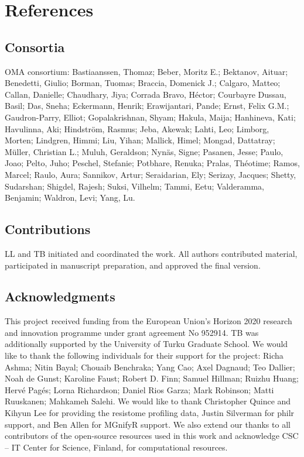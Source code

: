 \documentclass[
  sn-nature,
]{sn-jnl}
\begin{document}
\section{References}\label{references}

\renewcommand{\bibsection}{}


\subsection{Consortia}\label{sec-consortium}

OMA consortium: Bastiaanssen, Thomaz; Beber, Moritz E.; Bektanov,
Aituar; Benedetti, Giulio; Borman, Tuomas; Braccia, Domenick J.;
Calgaro, Matteo; Callan, Danielle; Chaudhary, Jiya; Corrada Bravo,
Héctor; Courbayre Dussau, Basil; Das, Sneha; Eckermann, Henrik;
Erawijantari, Pande; Ernst, Felix G.M.; Gaudron-Parry, Elliot;
Gopalakrishnan, Shyam; Hakula, Maija; Hanhineva, Kati; Havulinna, Aki;
Hindström, Rasmus; Jeba, Akewak; Lahti, Leo; Limborg, Morten; Lindgren,
Himmi; Liu, Yihan; Mallick, Himel; Mongad, Dattatray; Müller, Christian
L.; Muluh, Geraldson; Nynäs, Signe; Pasanen, Jesse; Paulo, Joao; Pelto,
Juho; Peschel, Stefanie; Potbhare, Renuka; Pralas, Théotime; Ramos,
Marcel; Raulo, Aura; Sannikov, Artur; Seraidarian, Ely; Serizay,
Jacques; Shetty, Sudarshan; Shigdel, Rajesh; Suksi, Vilhelm; Tammi,
Eetu; Valderamma, Benjamin; Waldron, Levi; Yang, Lu.

\subsection{Contributions}\label{sec-contributions}

LL and TB initiated and coordinated the work. All authors contributed
material, participated in manuscript preparation, and approved the final
version.

\subsection{Acknowledgments}\label{sec-acknowledgments}

This project received funding from the European Union's Horizon 2020
research and innovation programme under grant agreement No 952914. TB
was additionally supported by the University of Turku Graduate School.
We would like to thank the following individuals for their support for
the project: Richa Ashma; Nitin Bayal; Chouaib Benchraka; Yang Cao; Axel
Dagnaud; Teo Dallier; Noah de Gunst; Karoline Faust; Robert D. Finn;
Samuel Hillman; Ruizhu Huang; Hervé Pagés; Lorna Richardson; Daniel Rios
Garza; Mark Robinson; Matti Ruuskanen; Mahkameh Salehi. We would like to
thank Christopher Quince and Kihyun Lee for providing the resistome
profiling data, Justin Silverman for philr support, and Ben Allen for
MGnifyR support. We also extend our thanks to all contributors of the
open-source resources used in this work and acknowledge CSC -- IT Center
for Science, Finland, for computational resources.
\end{document}

